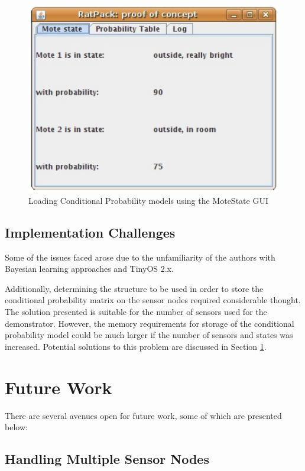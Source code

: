 \documentclass{sig-alternate-10pt}
\begin{document}
  \begin{figure}[h]
\centering
\includegraphics[scale=0.5]{img/MoteGUI2.png}
\caption{Loading Conditional Probability models using the MoteState GUI} 
\label{Fig6:MoteGUI2}
\end{figure}  

\subsection{Implementation Challenges}

Some of the issues faced arose due to the unfamiliarity of the authors with 
Bayesian learning approaches and TinyOS 2.x.

Additionally, determining the structure to be used in order to store the 
conditional probability matrix on the sensor nodes required considerable 
thought. The solution presented is suitable for the number of sensors used for 
the demonstrator. However, the memory requirements for storage of the 
conditional probability model could be much larger if the number of sensors and 
states was increased. Potential solutions to this problem are discussed in 
Section \ref{sec:FutureWork}.

\section{Future Work} \label{sec:FutureWork}

There are several avenues open for future work, some of which are presented 
below:

\subsection{Handling Multiple Sensor Nodes}
\end{document}
